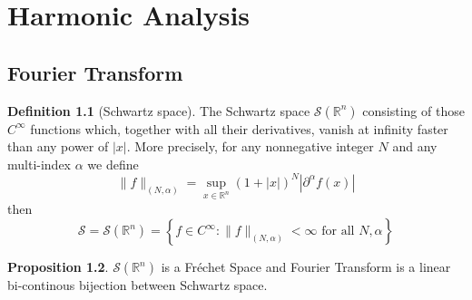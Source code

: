 \documentclass[12pt,a4paper]{book}
\newcommand{\bb}[1]{\mathbb{#1}}
\theoremstyle{definition}
\newtheorem{defn}{Definition}[section]
\newtheorem{prop}[defn]{Proposition}
\begin{document}
\chapter{Harmonic Analysis}
\section{Fourier Transform}
\begin{defn}[Schwartz space]
    The Schwartz space $\mathcal{S}(\mathbb{R}^n)$ consisting of those $C^{\infty}$ functions which, together with all their derivatives, vanish at infinity
    faster than any power of $|x|$. More precisely, for any nonnegative integer $N$ and any multi-index $\alpha$ we define   
    $$
    \|f\|_{(N, \alpha)}=\sup _{x \in \mathbb{R}^n}(1+|x|)^N\left|\partial^\alpha f(x)\right|
    $$
    then
    $$
    \mathcal{S}=\mathcal{S}(\bb{R}^n)=\left\{f \in C^{\infty}:\|f\|_{(N, \alpha)}<\infty \text { for all } N, \alpha\right\}
    $$
\end{defn}
\begin{prop}
    $\mathcal{S}(\bb{R}^n)$ is a Fréchet Space and Fourier Transform is a linear bi-continous bijection 
    between Schwartz space.
\end{prop}
\end{document}
